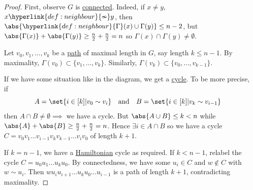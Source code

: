 \documentclass{article}
\begin{document}
\begin{proof}
    First, observe $G$ is \hyperlink{def:components}{connected}.
    Indeed, if $x \neq y$, $x \hyperlink{def:neighbour}{\nsim} y$, then $\abs{\hyperlink{def:neighbour}{\Gamma}(x) \cup \Gamma(y)} \leq n-2$, but $\abs{\Gamma(x)} + \abs{\Gamma(y)} \geq \frac{n}{2} + \frac{n}{2} = n$ so $\Gamma(x) \cap \Gamma(y) \neq \emptyset$.

    Let $v_0, v_1, \dotsc, v_k$ be a \hyperlink{def:path}{path} of maximal length in $G$, say length $k \leq n-1$.
    By maximality, $\Gamma(v_0) \subset \{v_1, \dotsc, v_k\}$. Similarly, $\Gamma(v_k) \subset \{v_0, \dotsc, v_{k-1}\}$.
    \begin{center}
    \end{center}

    If we have some situation like in the diagram, we get a \hyperlink{def:cycle}{cycle}. To be more precise, if
    \begin{equation*}
        A = \set{i \in [k] | v_0 \sim v_i} \quad \text{and} \quad B = \set{i \in [k] | v_k \sim v_{i-1}}
    \end{equation*}
    then $A \cap B \neq \emptyset \implies$ we have a cycle.
    But $\abs{A \cup B} \leq k < n$ while $\abs{A} + \abs{B} \geq \frac{n}{2} + \frac{n}{2} = n$.
    Hence $\exists i \in A \cap B$ so we have a cycle $C = v_0 v_1 \dotsc v_{i-1} v_k v_{k-1} \dotsc v_i v_0$ of length $k+1$.

    If $k = n-1$, we have a \hyperlink{def:hamil}{Hamiltonian} cycle as required.
    If $k < n-1$, relabel the cycle $C = u_0 u_1 \dotsc u_k u_0$.
    By connectedness, we have some $u_i \in C$ and $w \notin C$ with $w \sim u_i$.
    Then $w u_i u_{i+1} \dotsc u_k u_0 \dotsc u_{i-1}$ is a path of length $k+1$, contradicting maximality.
\end{proof}
\end{document}

